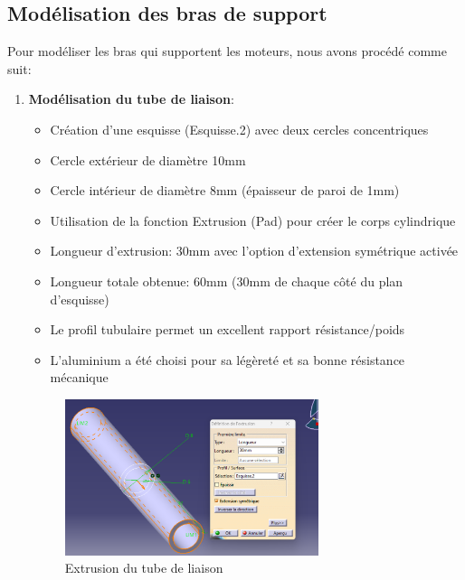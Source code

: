 \documentclass[a4paper,12pt]{report}
\begin{document}
\subsection{Modélisation des bras de support}
Pour modéliser les bras qui supportent les moteurs, nous avons procédé comme suit:
\begin{enumerate}
    \item \textbf{Modélisation du tube de liaison}:
    \begin{itemize}
        \item Création d'une esquisse (Esquisse.2) avec deux cercles concentriques
        \item Cercle extérieur de diamètre 10mm
        \item Cercle intérieur de diamètre 8mm (épaisseur de paroi de 1mm)
        \item Utilisation de la fonction Extrusion (Pad) pour créer le corps cylindrique
        \item Longueur d'extrusion: 30mm avec l'option d'extension symétrique activée
        \item Longueur totale obtenue: 60mm (30mm de chaque côté du plan d'esquisse)
        \item Le profil tubulaire permet un excellent rapport résistance/poids
        \item L'aluminium a été choisi pour sa légèreté et sa bonne résistance mécanique
    \end{itemize}
    \begin{figure}[H]
        \centering
        \includegraphics[width=0.7\textwidth]{images/extrusion_tube.png}
        \caption{Extrusion du tube de liaison}
        \label{fig:extrusion_tube}
    \end{figure}
    

\end{enumerate}
\end{document}
